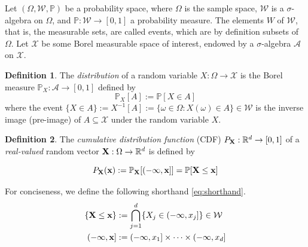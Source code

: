 \documentclass[twoside]{article} \usepackage{aistats2017}
\theoremstyle{definition}
\newtheorem{definition}{Definition}[section]
\theoremstyle{theorem}
\newcommand{\rv}[1]{{#1}}
\begin{document}
%
%
	Let $(\Omega, \mathcal{W}, \mathbb{P})$ be a probability space, where $\Omega$ is the sample space, $\mathcal{W}$ is a $\sigma$-algebra on $\Omega$, and $\mathbb{P} : \mathcal{W} \to [0, 1]$ a probability measure. The elements $W$ of $\mathcal{W}$, that is, the measurable sets, are called events, which are by definition subsets of $\Omega$. Let $\mathcal{X}$ be some Borel measurable space of interest, endowed by a $\sigma$-algebra $\mathcal{A}$ on $\mathcal{X}$.
%
%
	
	\begin{definition} \label{def:distribution}
		\citep{bauer1981probability}
		The \textit{distribution} of a random variable $\rv{X} : \Omega \to \mathcal{X}$ is the Borel measure $\mathbb{P}_{\rv{X}} : \mathcal{A} \to [0, 1]$ defined by
		\begin{equation}
			\mathbb{P}_{\rv{X}}[A] := \mathbb{P}[\rv{X} \in A]
		\label{eq:distribution}
		\end{equation}
		where the event $\{\rv{X} \in A\} := \rv{X}^{-1}[A] := \{\omega \in \Omega : \rv{X}(\omega) \in A\} \in \mathcal{W}$ is the inverse image (pre-image) of $A \subseteq \mathcal{X}$ under the random variable $\rv{X}$.
	\end{definition}
	
	\begin{definition} \label{def:cdf}
		\citep{bauer1981probability}
		The \textit{cumulative distribution function} (CDF) $P_{\bvec{\rv{X}}} : \mathbb{R}^{d} \to [0, 1]$ of a \textit{real-valued} random vector $\bvec{\rv{X}} : \Omega \to \mathbb{R}^{d}$ is defined by
		
		\begin{equation}
				P_{\bvec{\rv{X}}}(\bvec{x}) := \mathbb{P}_{\bvec{\rv{X}}}[(-\bvec{\infty}, \bvec{x}]] = \mathbb{P}[\bvec{\rv{X}} \leq \bvec{x}]
		\label{eq:cdf}
		\end{equation}

		For conciseness, we define the following shorthand \eqref{eq:shorthand}. 
		\begin{equation}
			\begin{aligned}
				\{\bvec{\rv{X}} \leq \bvec{x}\} &:= \bigcap\limits_{j = 1}^{d} \{\rv{X}_{j} \in (-\infty, x_{j}]\} \in \mathcal{W} \\
				(-\bvec{\infty}, \bvec{x}] &:= (-\infty, x_{1}] \times \dots \times (-\infty, x_{d}] \\
			\end{aligned}
		\label{eq:shorthand}
		\end{equation}
	\end{definition}
		
\end{document}
